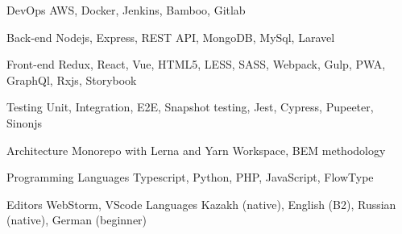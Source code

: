 

\begin{cvskills}

  \cvskill
    {DevOps} %
    {AWS, Docker, Jenkins, Bamboo, Gitlab} %

  \cvskill
    {Back-end} %
    {Nodejs, Express, REST API, MongoDB, MySql, Laravel} %

  \cvskill
    {Front-end} %
    {Redux, React, Vue, HTML5, LESS, SASS, Webpack, Gulp, PWA, GraphQl, Rxjs, Storybook} %

  \cvskill
    {Testing} %
    {Unit, Integration, E2E, Snapshot testing, Jest, Cypress, Pupeeter, Sinonjs} 

  \cvskill
    {Architecture} %
      {Monorepo with Lerna and Yarn Workspace, BEM methodology} 

  \cvskill
    {Programming Languages} %
    {Typescript, Python, PHP, JavaScript, FlowType} %

  \cvskill
    {Editors} %
    {WebStorm, VScode} 
  \cvskill
    {Languages} %
    {Kazakh (native), English (B2), Russian (native), German (beginner)} %

\end{cvskills}
